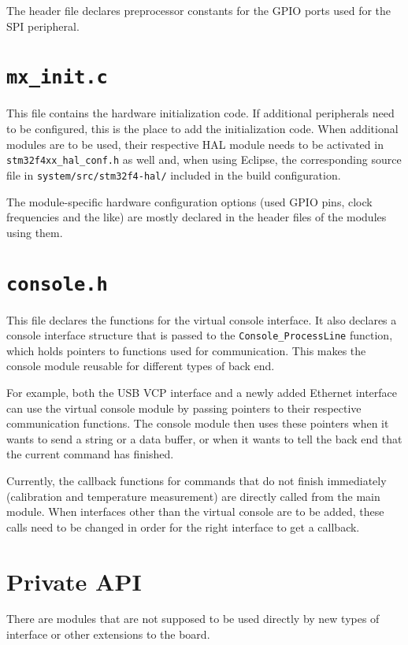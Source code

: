 The header file declares preprocessor constants for the GPIO ports used for the SPI peripheral.


\section{\texttt{mx\_init.c}}

This file contains the hardware initialization code. If additional peripherals need to be configured, this is the
place to add the initialization code. When additional modules are to be used, their respective HAL module needs
to be activated in \verb!stm32f4xx_hal_conf.h! as well and, when using Eclipse, the corresponding source file in
\verb!system/src/stm32f4-hal/! included in the build configuration.

The module-specific hardware configuration options (used GPIO pins, clock frequencies and the like) are mostly declared
in the header files of the modules using them.


\section{\texttt{console.h}}

This file declares the functions for the virtual console interface. It also declares a console interface structure
that is passed to the \verb!Console_ProcessLine! function, which holds pointers to functions used for communication.
This makes the console module reusable for different types of back end.

For example, both the USB VCP interface and a newly added Ethernet interface can use the virtual console module by
passing pointers to their respective communication functions. The console module then uses these pointers when it wants
to send a string or a data buffer, or when it wants to tell the back end that the current command has finished.

Currently, the callback functions for commands that do not finish immediately (calibration and temperature measurement)
are directly called from the main module. When interfaces other than the virtual console are to be added, these
calls need to be changed in order for the right interface to get a callback.


\section{Private API}

There are modules that are not supposed to be used directly by new types of interface or other extensions to the board.

